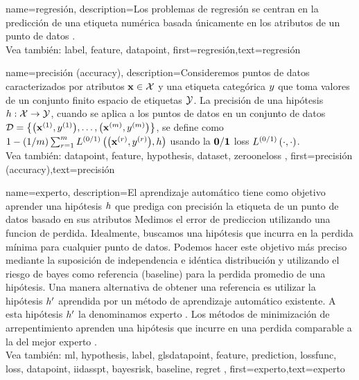 {name={regresión},
	description={Los problemas de regresión se centran en la predicción de una 
		etiqueta numérica basada únicamente en los atributos de un punto de datos \cite[Ch. 2]{MLBasics}.
		\\
		Vea también: \gls{label}, \gls{feature}, \gls{datapoint}},
	first={regresión},text={regresión} 
}

{name={precisión (accuracy)},
	description={Consideremos puntos de datos caracterizados por atributos ${\bf x} \in \mathcal{X}$ y 
		una etiqueta categórica $y$ que toma valores de un conjunto finito espacio de etiquetas $\mathcal{Y}$. La 
		precisión de una hipótesis $h: \mathcal{X} \rightarrow \mathcal{Y}$, cuando se aplica a los
		puntos de datos en un conjunto de datos $\mathcal{D} = \big\{ \big({\bf x}^{(1)}, y^{(1)} \big), \ldots, \big({\bf x}^{(m)},y^{(m)}\big) \big\}$, 
		se define como $1 - (1/m)\sum_{r=1}^{m} L^{(0/1)}\left(\big({\bf x}^{(r)},y^{(r)}\big),h \right)$ usando la $\bf 0/1$ loss $L^{(0/1)}\left(\cdot,\cdot \right)$.
		\\
		Vea también:  \gls{datapoint}, \gls{feature}, \gls{hypothesis}, \gls{dataset},  \gls{zerooneloss} },
	first={precisión (accuracy)},text={precisión} 
}





{name={experto},
	description={El aprendizaje automático tiene como objetivo aprender una hipótesis $h$ que prediga con precisión la etiqueta
		de un punto de datos basado en sus atributos Medimos el error de prediccion utilizando una
		funcion de perdida. Idealmente, buscamos una hipótesis que incurra en la perdida mínima
		para cualquier punto de datos. Podemos hacer este objetivo más preciso mediante la suposición de independencia e idéntica distribución 
		y utilizando el riesgo de bayes como referencia (baseline) para la perdida promedio de una hipótesis. 
		Una manera alternativa de obtener una referencia es utilizar la hipótesis $h'$ aprendida 
		por un método de aprendizaje automático existente. A esta hipótesis $h'$ la denominamos experto \cite{PredictionLearningGames}. Los métodos de minimización de arrepentimiento aprenden una hipótesis
		que incurre en una perdida comparable a la del mejor experto \cite{PredictionLearningGames,HazanOCO}.
		\\
		Vea también: \gls{ml}, \gls{hypothesis}, \gls{label}, gls{datapoint}, \gls{feature}, \gls{prediction}, \gls{lossfunc}, \gls{loss}, \gls{datapoint}, \gls{iidasspt}, \gls{bayesrisk}, \gls{baseline}, \Gls{regret} },
	first={experto},text={experto} 
}

